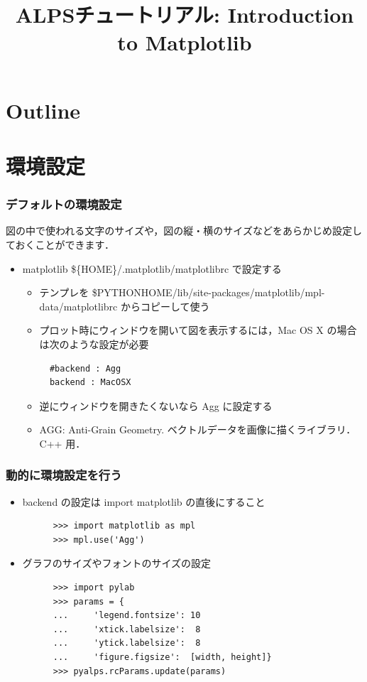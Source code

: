
\title{ALPSチュートリアル: Introduction to Matplotlib}



\begin{frame}
  \titlepage
\end{frame}

\section*{Outline}
\begin{frame}
  \tableofcontents
\end{frame}

\section{環境設定}
\begin{frame}[t,fragile]
\frametitle{デフォルトの環境設定}
図の中で使われる文字のサイズや，図の縦・横のサイズなどをあらかじめ設定しておくことができます．
\begin{itemize}
\item matplotlib \$\{HOME\}/.matplotlib/matplotlibrc で設定する
\begin{itemize}
\item テンプレを \$PYTHONHOME/lib/site-packages/matplotlib/mpl-data/matplotlibrc からコピーして使う
\item プロット時にウィンドウを開いて図を表示するには，Mac OS X の場合は次のような設定が必要
  \begin{lstlisting}
  #backend : Agg
  backend : MacOSX
  \end{lstlisting}
\item 逆にウィンドウを開きたくないなら Agg に設定する
\item AGG: Anti-Grain Geometry. ベクトルデータを画像に描くライブラリ．C++ 用．
\end{itemize}
\end{itemize}

\end{frame}

\begin{frame}[t,fragile]
\frametitle{動的に環境設定を行う}
\begin{itemize}
\item backend の設定は import matplotlib の直後にすること
      \begin{lstlisting}
      >>> import matplotlib as mpl
      >>> mpl.use('Agg')
      \end{lstlisting}
\item グラフのサイズやフォントのサイズの設定
      \begin{lstlisting}
      >>> import pylab
      >>> params = {
      ...     'legend.fontsize': 10
      ...     'xtick.labelsize':  8
      ...     'ytick.labelsize':  8
      ...     'figure.figsize':  [width, height]}
      >>> pyalps.rcParams.update(params)
      \end{lstlisting}
\end{itemize}
\end{frame}

